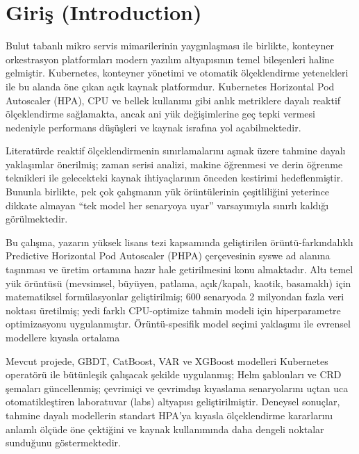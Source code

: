 \section{Giriş (Introduction)}

Bulut tabanlı mikro servis mimarilerinin yaygınlaşması ile birlikte, konteyner orkestrasyon platformları modern yazılım altyapısının temel bileşenleri haline gelmiştir. Kubernetes, konteyner yönetimi ve otomatik ölçeklendirme yetenekleri ile bu alanda öne çıkan açık kaynak platformdur. Kubernetes Horizontal Pod Autoscaler (HPA), CPU ve bellek kullanımı gibi anlık metriklere dayalı reaktif ölçeklendirme sağlamakta, ancak ani yük değişimlerine geç tepki vermesi nedeniyle performans düşüşleri ve kaynak israfına yol açabilmektedir.

Literatürde reaktif ölçeklendirmenin sınırlamalarını aşmak üzere tahmine dayalı yaklaşımlar önerilmiş; zaman serisi analizi, makine öğrenmesi ve derin öğrenme teknikleri ile gelecekteki kaynak ihtiyaçlarının önceden kestirimi hedeflenmiştir. Bununla birlikte, pek çok çalışmanın yük örüntülerinin çeşitliliğini yeterince dikkate almayan “tek model her senaryoya uyar” varsayımıyla sınırlı kaldığı görülmektedir.

Bu çalışma, yazarın yüksek lisans tezi kapsamında geliştirilen örüntü-farkındalıklı Predictive Horizontal Pod Autoscaler (PHPA) çerçevesinin syswe ad alanına taşınması ve üretim ortamına hazır hale getirilmesini konu almaktadır. Altı temel yük örüntüsü (mevsimsel, büyüyen, patlama, açık/kapalı, kaotik, basamaklı) için matematiksel formülasyonlar geliştirilmiş; 600 senaryoda 2 milyondan fazla veri noktası üretilmiş; yedi farklı CPU-optimize tahmin modeli için hiperparametre optimizasyonu uygulanmıştır. Örüntü-spesifik model seçimi yaklaşımı ile evrensel modellere kıyasla ortalama %

Mevcut projede, GBDT, CatBoost, VAR ve XGBoost modelleri Kubernetes operatörü ile bütünleşik çalışacak şekilde uygulanmış; Helm şablonları ve CRD şemaları güncellenmiş; çevrimiçi ve çevrimdışı kıyaslama senaryolarını uçtan uca otomatikleştiren laboratuvar (labs) altyapısı geliştirilmiştir. Deneysel sonuçlar, tahmine dayalı modellerin standart HPA'ya kıyasla ölçeklendirme kararlarını anlamlı ölçüde öne çektiğini ve kaynak kullanımında daha dengeli noktalar sunduğunu göstermektedir.

